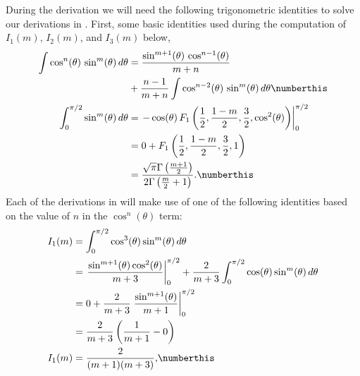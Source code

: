 During the derivation we will need the following trigonometric identities
to solve our derivations in .
First, some basic identities used during the computation of $I_1(m)$, $I_2(m)$,
and $I_3(m)$ below,
\begin{align*}
\int \cos^n(\theta) \, \sin^m(\theta) \, d\theta 
   &= \frac{\sin^{m+1}(\theta) \, \cos^{n-1}(\theta)}{m+n} \\
   &+ \frac{n-1}{m+n} \int \cos^{n-2}(\theta) \, \sin^m(\theta) \, d\theta
      \numberthis \label{eq:cospow} \\
\int_0^{\pi/2} \sin^m(\theta) \, d\theta
   &= \left. 
      -\cos(\theta) \, F_1\left(\frac{1}{2}, \frac{1-m}{2}, \frac{3}{2}, \cos^2(\theta) \right)
      \right|_0^{\pi/2} \\
   &= 0 + F_1\left(\frac{1}{2}, \frac{1-m}{2}, \frac{3}{2}, 1 \right) \\
   &= \frac{\sqrt{\pi} \Gamma\left(\frac{m+1}{2}\right)}
           {2 \Gamma\left(\frac{m}{2} + 1\right)} \text{.}
     \numberthis \label{eq:sinpow} 
\end{align*}
Each of the derivations in  will make use of one of
the following identities based on the value of $n$ in the 
$\cos^n(\theta)$ term:
\begin{align*}
I_1(m) &= \int_0^{\pi/2} \cos^3(\theta) \sin^m(\theta) \, d\theta \\
       &= \left. \frac{\sin^{m+1}(\theta)\cos^2(\theta)}{m+3} \right|_0^{\pi/2}
        + \frac{2}{m+3} \int_0^{\pi/2} \cos(\theta)\sin^m(\theta) \, d\theta \\
       &= 0 
        + \frac{2}{m+3} \left. \frac{\sin^{m+1}(\theta)}{m+1} \right|_0^{\pi/2} \\
       &= \frac{2}{m+3} \left(\frac{1}{m+1} - 0 \right) \\
I_1(m) &= \frac{2}{(m+1)(m+3)}
\text{,}
\numberthis \label{eq:i1} \\
\end{align*}
